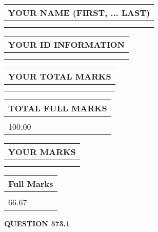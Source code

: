 \documentclass{ctexart}
\begin{document}
   
   
   
\newpage 
\setcounter{page}{ 
   573001 } 
   
   
   
   
\noindent\begin{tabular}{|l|}
\hline
YOUR NAME (FIRST, ... LAST)  \\
\hline
 \\ 
 \\ 
\hline
\end{tabular}
\hspace{0.05in} \begin{tabular}{|l|}
\hline
 YOUR   ID   INFORMATION  \\
\hline
 \\ 
 \\ 
\hline
\end{tabular}
   
   
\vspace{0.2in}\noindent\begin{tabular}{|l|}
\hline
YOUR TOTAL MARKS  \\
\hline
 \\ 
 \\ 
\hline
\end{tabular}
\hspace{0.05in} \begin{tabular}{|l|}
\hline
TOTAL FULL MARKS  \\
\hline
 \\ 
100.00 \\
\hline
\end{tabular}
   
   
 \vspace{0.2in}
 
 
 
 
   
   
  
\vspace{0.2in}
  
\noindent\begin{tabular}{|l|}
\hline
 YOUR MARKS  \\
\hline
 \\ 
 \\ 
\hline
\end{tabular}
\hspace{0.05in} \begin{tabular}{|l|}
\hline
 Full Marks  \\
\hline
 \\ 
66.67 \\
\hline
\end{tabular}
{\textbf{\Large{QUESTION
573.1 
}}}
  
\end{document}
